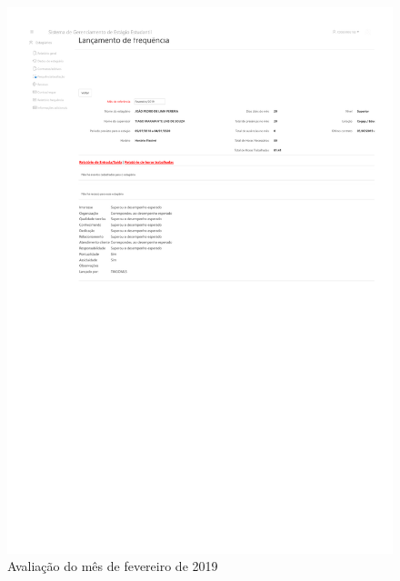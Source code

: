 \begin{anexosenv}
\begin{figure}
    \centering
    \includegraphics[trim=100 410 0 140, clip, width=\textwidth]{anexos/avaliacao201902}
    \caption{Avaliação do mês de fevereiro de 2019}
    \label{fig:avaliacao201902}
\end{figure}


\end{anexosenv}
